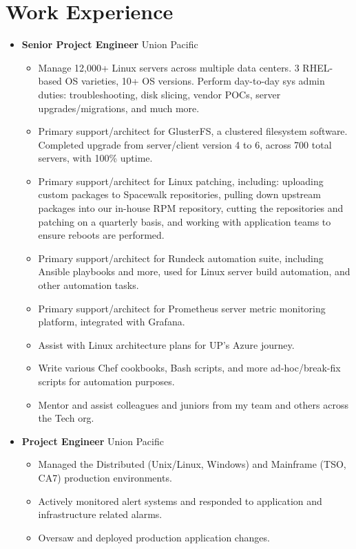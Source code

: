 \documentclass[10pt, a4paper]{article}
\begin{document}
\section*{Work Experience}
\begin{itemize}
    \item \textbf{Senior Project Engineer} Union Pacific
    \begin{itemize}
        \item Manage 12,000+ Linux servers across multiple data centers. 3 RHEL-based OS varieties, 10+ OS versions. Perform day-to-day sys admin duties: troubleshooting, disk slicing, vendor POCs, server upgrades/migrations, and much more.
        \item Primary support/architect for GlusterFS, a clustered filesystem software. Completed upgrade from server/client version 4 to 6, across 700 total servers, with 100\% uptime.
        \item Primary support/architect for Linux patching, including: uploading custom packages to Spacewalk repositories, pulling down upstream packages into our in-house RPM repository, cutting the repositories and patching on a quarterly basis, and working with application teams to ensure reboots are performed.
        \item Primary support/architect for Rundeck automation suite, including Ansible playbooks and more, used for Linux server build automation, and other automation tasks.
        \item Primary support/architect for Prometheus server metric monitoring platform, integrated with Grafana.
        \item Assist with Linux architecture plans for UP's Azure journey.
        \item Write various Chef cookbooks, Bash scripts, and more ad-hoc/break-fix scripts for automation purposes.
        \item Mentor and assist colleagues and juniors from my team and others across the Tech org.
    \end{itemize}
    \item \textbf{Project Engineer} Union Pacific
    \begin{itemize}
        \item Managed the Distributed (Unix/Linux, Windows) and Mainframe (TSO, CA7) production environments.
        \item Actively monitored alert systems and responded to application and infrastructure related alarms.
        \item Oversaw and deployed production application changes.

\end{itemize}
\end{itemize}
\end{document}
